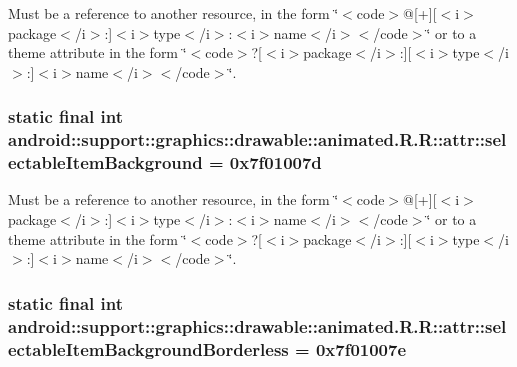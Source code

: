 Must be a reference to another resource, in the form \char`\"{}$<$code$>$@\mbox{[}+\mbox{]}\mbox{[}$<$i$>$package$<$/i$>$:\mbox{]}$<$i$>$type$<$/i$>$:$<$i$>$name$<$/i$>$$<$/code$>$\char`\"{} or to a theme attribute in the form \char`\"{}$<$code$>$?\mbox{[}$<$i$>$package$<$/i$>$:\mbox{]}\mbox{[}$<$i$>$type$<$/i$>$:\mbox{]}$<$i$>$name$<$/i$>$$<$/code$>$\char`\"{}. \hypertarget{classandroid_1_1support_1_1graphics_1_1drawable_1_1animated_1_1_r_1_1attr_4eadc3836cddcf7f414cbedd98fceb14}{
\subsubsection[{selectableItemBackground}]{\setlength{\rightskip}{0pt plus 5cm}static final int android::support::graphics::drawable::animated.R.R::attr::selectableItemBackground = 0x7f01007d}}
\label{classandroid_1_1support_1_1graphics_1_1drawable_1_1animated_1_1_r_1_1attr_4eadc3836cddcf7f414cbedd98fceb14}


Must be a reference to another resource, in the form \char`\"{}$<$code$>$@\mbox{[}+\mbox{]}\mbox{[}$<$i$>$package$<$/i$>$:\mbox{]}$<$i$>$type$<$/i$>$:$<$i$>$name$<$/i$>$$<$/code$>$\char`\"{} or to a theme attribute in the form \char`\"{}$<$code$>$?\mbox{[}$<$i$>$package$<$/i$>$:\mbox{]}\mbox{[}$<$i$>$type$<$/i$>$:\mbox{]}$<$i$>$name$<$/i$>$$<$/code$>$\char`\"{}. \hypertarget{classandroid_1_1support_1_1graphics_1_1drawable_1_1animated_1_1_r_1_1attr_285c3e938938445a00bf9f341937b4a9}{
\subsubsection[{selectableItemBackgroundBorderless}]{\setlength{\rightskip}{0pt plus 5cm}static final int android::support::graphics::drawable::animated.R.R::attr::selectableItemBackgroundBorderless = 0x7f01007e}}
\label{classandroid_1_1support_1_1graphics_1_1drawable_1_1animated_1_1_r_1_1attr_285c3e938938445a00bf9f341937b4a9}


